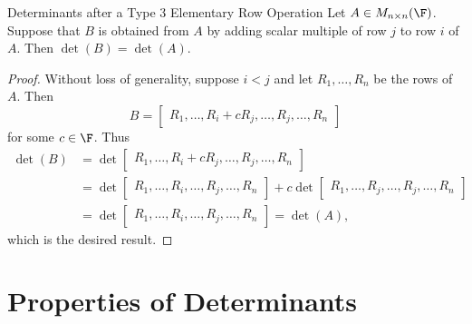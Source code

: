 \documentclass[linearalgebra]{subfiles}
\begin{document}
    \begin{prop}{Determinants after a Type 3 Elementary Row Operation}
        Let $A\in M_{n\times n}(\F)$. Suppose that $B$ is obtained from $A$ by adding scalar multiple of row $j$ to row $i$ of $A$. Then $\det(B) = \det(A)$.
    \end{prop}

    \begin{proof}
        Without loss of generality, suppose $i < j$ and let $R_1, \ldots, R_n$ be the rows of $A$. Then
        \begin{equation*}
            B = 
            \begin{bmatrix}
                R_1, \ldots, R_i + cR_j, \ldots, R_j, \ldots, R_n
            \end{bmatrix}
        \end{equation*}
        for some $c\in \F$. Thus
        \begin{align*}
            \det(B) & = \det
            \begin{bmatrix}
                R_1, \ldots, R_i+cR_j, \ldots, R_j, \ldots, R_n
            \end{bmatrix} \\
                    & = \det
            \begin{bmatrix}
                R_1, \ldots, R_i, \ldots, R_j, \ldots, R_n
            \end{bmatrix}
            + c \det
            \begin{bmatrix}
                R_1, \ldots, R_j, \ldots, R_j, \ldots, R_n
            \end{bmatrix} \\
                    & = \det
            \begin{bmatrix}
                R_1, \ldots, R_i, \ldots, R_j, \ldots, R_n
            \end{bmatrix}
            = \det(A),
        \end{align*} 
        which is the desired result.
    \end{proof}

    \section{Properties of Determinants}
\end{document}

